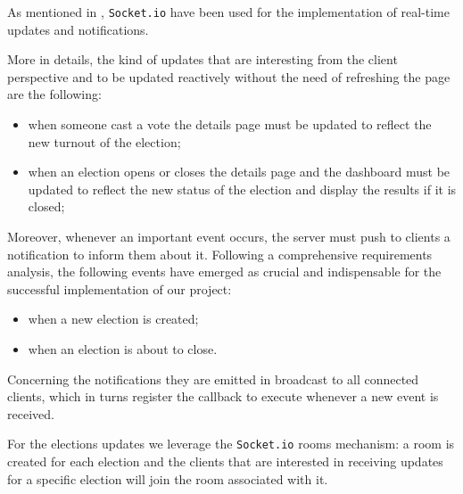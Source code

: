 \documentclass{scrartcl}
\begin{document}
As mentioned in , \texttt{Socket.io} have been used for the implementation of real-time updates and notifications.

More in details, the kind of updates that are interesting from the client perspective and to be updated reactively without the need of refreshing the page are the following:

\begin{itemize}
    \item when someone cast a vote the details page must be updated to reflect the new turnout of the election;
    \item when an election opens or closes the details page and the dashboard must be updated to reflect the new status of the election and display the results if it is closed;
\end{itemize}

Moreover, whenever an important event occurs, the server must push to clients a notification to inform them about it.
%
Following a comprehensive requirements analysis, the following events have emerged as crucial and indispensable for the successful implementation of our project:

\begin{itemize}
    \item when a new election is created;
    \item when an election is about to close.
\end{itemize}


Concerning the notifications they are emitted in broadcast to all connected clients, which in turns register the callback to execute whenever a new event is received.


For the elections updates we leverage the \texttt{Socket.io} rooms mechanism: a room is created for each election and the clients that are interested in receiving updates for a specific election will join the room associated with it.
\end{document}
